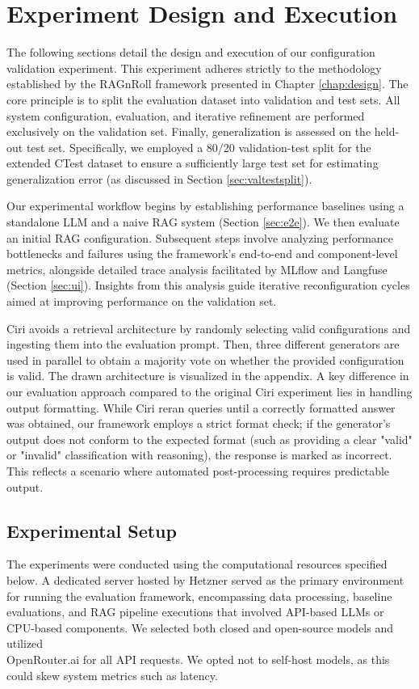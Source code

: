 \section{Experiment Design and Execution} \label{sec:exp_design_exec}
The following sections detail the design and execution of our configuration validation experiment. This experiment adheres strictly to the methodology established by the RAGnRoll framework presented in Chapter \ref{chap:design}. The core principle is to split the evaluation dataset into validation and test sets. All system configuration, evaluation, and iterative refinement are performed exclusively on the validation set. Finally, generalization is assessed on the held-out test set. Specifically, we employed a 80/20 validation-test split for the extended CTest dataset to ensure a sufficiently large test set for estimating generalization error (as discussed in Section \ref{sec:valtestsplit}).

Our experimental workflow begins by establishing performance baselines using a standalone LLM and a naive RAG system (Section \ref{sec:e2e}). We then evaluate an initial RAG configuration. Subsequent steps involve analyzing performance bottlenecks and failures using the framework's end-to-end and component-level metrics, alongside detailed trace analysis facilitated by MLflow and Langfuse (Section \ref{sec:ui}). Insights from this analysis guide iterative reconfiguration cycles aimed at improving performance on the validation set.

Ciri avoids a retrieval architecture by randomly selecting valid configurations and ingesting them into the evaluation prompt. Then, three different generators are used in parallel to obtain a majority vote on whether the provided configuration is valid. The drawn architecture is visualized in the appendix. A key difference in our evaluation approach compared to the original Ciri experiment \cite{Lian.2024} lies in handling output formatting. While Ciri reran queries until a correctly formatted answer was obtained, our framework employs a strict format check; if the generator's output does not conform to the expected format (such as providing a clear "valid" or "invalid" classification with reasoning), the response is marked as incorrect. This reflects a scenario where automated post-processing requires predictable output.


\subsection{Experimental Setup} \label{sec:exp_setup}
The experiments were conducted using the computational resources specified below. A dedicated server hosted by Hetzner served as the primary environment for running the evaluation framework, encompassing data processing, baseline evaluations, and RAG pipeline executions that involved API-based LLMs or CPU-based components. We selected both closed and open-source models and utilized \\OpenRouter.ai \cite{openrouter-inc-2023} for all API requests. We opted not to self-host models, as this could skew system metrics such as latency.

